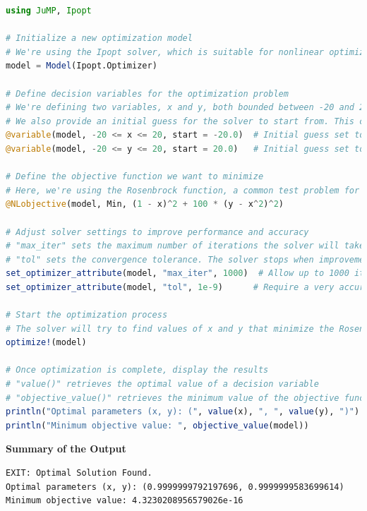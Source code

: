 \begin{lstlisting}[language=Julia,style=mystyle]
using JuMP, Ipopt

# Initialize a new optimization model
# We're using the Ipopt solver, which is suitable for nonlinear optimization problems
model = Model(Ipopt.Optimizer)

# Define decision variables for the optimization problem
# We're defining two variables, x and y, both bounded between -20 and 20
# We also provide an initial guess for the solver to start from. This can influence the solution found.
@variable(model, -20 <= x <= 20, start = -20.0)  # Initial guess set to -20 for x
@variable(model, -20 <= y <= 20, start = 20.0)   # Initial guess set to 20 for y

# Define the objective function we want to minimize
# Here, we're using the Rosenbrock function, a common test problem for optimization algorithms
@NLobjective(model, Min, (1 - x)^2 + 100 * (y - x^2)^2)

# Adjust solver settings to improve performance and accuracy
# "max_iter" sets the maximum number of iterations the solver will take
# "tol" sets the convergence tolerance. The solver stops when improvements are smaller than this value.
set_optimizer_attribute(model, "max_iter", 1000)  # Allow up to 1000 iterations
set_optimizer_attribute(model, "tol", 1e-9)      # Require a very accurate solution

# Start the optimization process
# The solver will try to find values of x and y that minimize the Rosenbrock function
optimize!(model)

# Once optimization is complete, display the results
# "value()" retrieves the optimal value of a decision variable
# "objective_value()" retrieves the minimum value of the objective function
println("Optimal parameters (x, y): (", value(x), ", ", value(y), ")")
println("Minimum objective value: ", objective_value(model))

\end{lstlisting}
\textbf{Summary of the Output} 
\begin{verbatim}
EXIT: Optimal Solution Found.
Optimal parameters (x, y): (0.9999999792197696, 0.9999999583699614)
Minimum objective value: 4.3230208956579026e-16
\end{verbatim}
\vspace*{.4cm}

